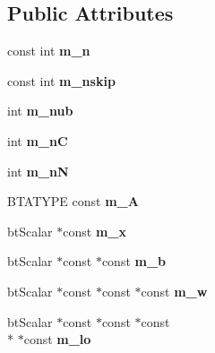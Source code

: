 \subsection*{Public Attributes}
\begin{DoxyCompactItemize}
\item 
\hypertarget{structbt_l_c_p_ac8c8fd565e74f55450f4abdd04954c92}{const int {\bfseries m\+\_\+n}}\label{structbt_l_c_p_ac8c8fd565e74f55450f4abdd04954c92}

\item 
\hypertarget{structbt_l_c_p_ae8ec68abc6a78202c1533581104f164a}{const int {\bfseries m\+\_\+nskip}}\label{structbt_l_c_p_ae8ec68abc6a78202c1533581104f164a}

\item 
\hypertarget{structbt_l_c_p_a51d9683d575838c18ad046dffa52a0c5}{int {\bfseries m\+\_\+nub}}\label{structbt_l_c_p_a51d9683d575838c18ad046dffa52a0c5}

\item 
\hypertarget{structbt_l_c_p_aeee48c144803b6279e9d89f5a3d5274e}{int {\bfseries m\+\_\+n\+C}}\label{structbt_l_c_p_aeee48c144803b6279e9d89f5a3d5274e}

\item 
\hypertarget{structbt_l_c_p_a7ec31227dca361284651e5d52c0fd564}{int {\bfseries m\+\_\+n\+N}}\label{structbt_l_c_p_a7ec31227dca361284651e5d52c0fd564}

\item 
\hypertarget{structbt_l_c_p_a1c0a8e6fc3f21e89ec2c4cddd11cf73e}{B\+T\+A\+T\+Y\+P\+E const {\bfseries m\+\_\+\+A}}\label{structbt_l_c_p_a1c0a8e6fc3f21e89ec2c4cddd11cf73e}

\item 
\hypertarget{structbt_l_c_p_aead7fa2a27c86cc54d606aa51d715464}{bt\+Scalar $\ast$const {\bfseries m\+\_\+x}}\label{structbt_l_c_p_aead7fa2a27c86cc54d606aa51d715464}

\item 
\hypertarget{structbt_l_c_p_addda0b0a2a2cb39f4321b11353c50a86}{bt\+Scalar $\ast$const $\ast$const {\bfseries m\+\_\+b}}\label{structbt_l_c_p_addda0b0a2a2cb39f4321b11353c50a86}

\item 
\hypertarget{structbt_l_c_p_af142d857c3eead5ef1c7156ac6f62416}{bt\+Scalar $\ast$const $\ast$const $\ast$const {\bfseries m\+\_\+w}}\label{structbt_l_c_p_af142d857c3eead5ef1c7156ac6f62416}

\item 
\hypertarget{structbt_l_c_p_a326b08ad06b1e152f15935d28796f04c}{bt\+Scalar $\ast$const $\ast$const $\ast$const \\*
$\ast$const {\bfseries m\+\_\+lo}}\label{structbt_l_c_p_a326b08ad06b1e152f15935d28796f04c}


\end{DoxyCompactItemize}
